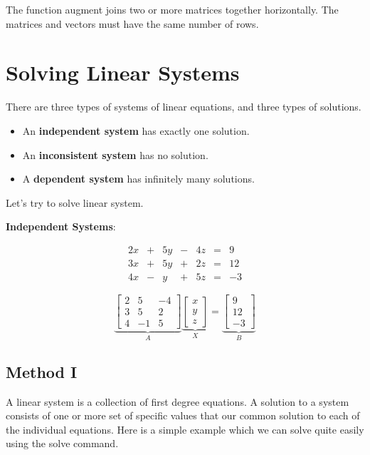 \documentclass[
]{book}
\providecommand{\tightlist}{%
  \setlength{\itemsep}{0pt}\setlength{\parskip}{0pt}}
\theoremstyle{definition}
\theoremstyle{definition}
\theoremstyle{definition}
\theoremstyle{definition}
\theoremstyle{remark}
\begin{document}
The function augment joins two or more matrices together horizontally.
The matrices and vectors must have the same number of rows.

\section{Solving Linear Systems}\label{solving-linear-systems}

There are three types of systems of linear equations, and three types of solutions.

\begin{itemize}
\tightlist
\item
  An \textbf{independent system} has exactly one solution.
\item
  An \textbf{inconsistent system} has no solution.
\item
  A \textbf{dependent system} has infinitely many solutions.
\end{itemize}

Let's try to solve linear system.

\textbf{Independent Systems}:

\[ \begin{array}{ccccccc} 
2x &+& 5y &-& 4z &=& 9 \\
3x &+& 5y &+& 2z &=& 12 \\
4x &-& y  &+& 5z &=& -3 
\end{array} \]

\[
\underbrace{\begin{bmatrix}
2 & 5 & -4 \\
3 & 5 & 2   \\
4 & -1 & 5  
\end{bmatrix}}_A
\underbrace{\begin{bmatrix}
x \\ y\\z
\end{bmatrix}}_X
=
\underbrace{\begin{bmatrix}
9\\12\\-3
\end{bmatrix}}_B
\]

\subsection{Method I}\label{method-i}

A linear system is a collection of first degree equations.
A solution to a system consists of one or more set of specific values that our common solution to each of the individual equations.
Here is a simple example which we can solve quite easily using the solve command.
\end{document}
